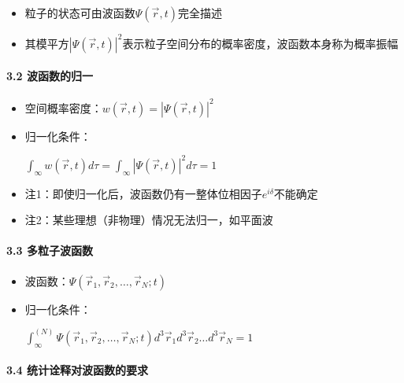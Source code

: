 \documentclass[UTF8,twocolumn]{ctexart}
\providecommand{\tightlist}{%
  \setlength{\itemsep}{0pt}\setlength{\parskip}{0pt}}
\let\oldparagraph\paragraph
\renewcommand{\paragraph}[1]{\oldparagraph{#1}\mbox{}}
\begin{document}
\begin{itemize}
\tightlist
\item
  粒子的状态可由波函数\(\Psi(\vec{r},t)\)完全描述
\item
  其模平方\(|\Psi(\vec{r},t)|^2\)表示粒子空间分布的概率密度，波函数本身称为概率振幅
\end{itemize}

\hypertarget{ux6ce2ux51fdux6570ux7684ux5f52ux4e00}{%
\paragraph{{ }3.2
波函数的归一}\label{ux6ce2ux51fdux6570ux7684ux5f52ux4e00}}

\begin{itemize}
\tightlist
\item
  空间概率密度：\(w(\vec{r},t)=|\Psi(\vec{r},t)|^2\)
\item
  归一化条件：
  \begin{center}
    \(\int_\infty w(\vec{r},t)d\tau=\int_\infty|\Psi(\vec{r},t)|^2d\tau=1\)
  \end{center}
\item
  注1：即使归一化后，波函数仍有一整体位相因子\(e^{i\delta}\)不能确定
\item
  注2：某些理想（非物理）情况无法归一，如平面波
\end{itemize}

\hypertarget{ux591aux7c92ux5b50ux6ce2ux51fdux6570}{%
\paragraph{{ }3.3
多粒子波函数}\label{ux591aux7c92ux5b50ux6ce2ux51fdux6570}}

\begin{itemize}
\tightlist
\item
  波函数：\(\Psi(\vec{r}_1,\vec{r}_2,\ldots,\vec{r}_N;t)\)
\item
  归一化条件：
  \begin{center}
    \(\int_\infty^{(N)}\Psi(\vec{r}_1,\vec{r}_2,\ldots,\vec{r}_N;t)d^3\vec{r}_1d^3\vec{r}_2\ldots d^3\vec{r}_N=1\)
  \end{center}
\end{itemize}

\hypertarget{ux7edfux8ba1ux8be0ux91caux5bf9ux6ce2ux51fdux6570ux7684ux8981ux6c42}{%
\paragraph{{ }3.4
统计诠释对波函数的要求}\label{ux7edfux8ba1ux8be0ux91caux5bf9ux6ce2ux51fdux6570ux7684ux8981ux6c42}}
\end{document}
